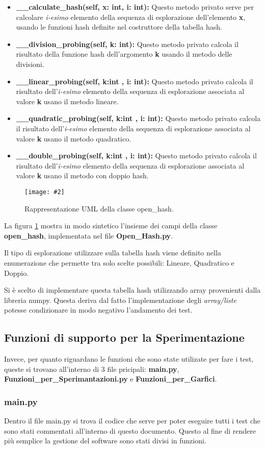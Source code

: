 \documentclass{article}
\newcommand{\image}[3][1]{
	\centering
	\texttt{[image: \#2]}
	\caption{#3}
}
\newcommand{\newlineitem}[1]{\item \textbf{#1} \hfill \break}
\begin{document}
\begin{itemize}
\newlineitem{\_\_calculate\_hash(self, x: int, i: int):}
Questo metodo privato serve per calcolare \emph{i-esimo} elemento della sequenza di esplorazione dell'elemento \textbf{x}, usando le funzioni hash definite nel costruttore della tabella hash.
\newlineitem{\_\_division\_probing(self, k: int):}
Questo metodo privato calcola il risultato della funzione hash dell'argomento \textbf{k} usando il metodo delle divisioni.
\newlineitem{\_\_linear\_probing(self, k:int , i: int):}
Questo metodo privato calcola il risultato dell'\emph{i-esimo} elemento della sequenza di esplorazione associata al valore \textbf{k} usano il metodo lineare.
\newlineitem{\_\_quadratic\_probing(self, k:int , i: int):}
Questo metodo privato calcola il risultato dell'\emph{i-esimo} elemento della sequenza di esplorazione associata al valore \textbf{k} usano il metodo quadratico.
\newlineitem{\_\_double\_probing(self, k:int , i: int):}
Questo metodo privato calcola il risultato dell'\emph{i-esimo} elemento della sequenza di esplorazione associata al valore \textbf{k} usano il metodo con doppio hash.
\end{itemize}

\begin{figure}[H]
\image[0.40]{Class_UML}{Rappresentazione UML della classe open\_hash.}
\label{fig:Class_UML}
\end{figure}

La figura \ref{fig:Class_UML} mostra in modo sintetico l'insieme dei campi della classe \textbf{open\_hash}, implementata nel file \textbf{Open\_Hash.py}.

Il tipo di esplorazione utilizzare sulla tabella hash viene definito nella enumerazione che permette tra solo scelte possibili: Lineare, Quadratico e Doppio.

Si è scelto di implementare questa tabella hash utilizzando array provenienti dalla libreria numpy. Questa deriva dal fatto l'implementazione degli \emph{array/liste} potesse condizionare in modo negativo l'andamento dei test.

\subsection{Funzioni di supporto per la Sperimentazione}
Invece, per quanto riguardano le funzioni che sono state utilizate per fare i test, queste si trovano all'interno di 3 file pricipali: \textbf{main.py}, \textbf{Funzioni\_per\_Sperimantazioni.py} e \textbf{Funzioni\_per\_Garfici}.

\subsubsection{main.py}
Dentro il file main.py si trova il codice che serve per poter eseguire tutti i test che sono stati commentati all'interno di questo documento. Questo al fine di rendere più semplice la gestione del software sono stati divisi in funzioni.
\end{document}

